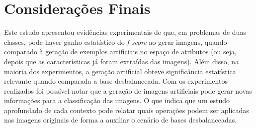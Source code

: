 \section{Considerações Finais}

Este estudo apresentou evidências experimentais de que, em problemas de duas classes, pode haver ganho estatístico do \textit{f-score} ao gerar imagens, quando comparado à geração de exemplos artificiais no espaço de atributos (ou seja, depois que as características já foram extraídas das imagens). Além disso, na maioria dos experimentos, a geração artificial obteve significância estatística relevante quando comparada a base desbalanceada. Com os experimentos realizados foi possível notar que a geração de imagens artificiais pode gerar novas informações para a classificação das imagens. O que indica que um estudo aprofundado de cada contexto pode relatar quais operações podem ser aplicadas nas imagens originais de forma a auxiliar o cenário de bases desbalanceadas.
